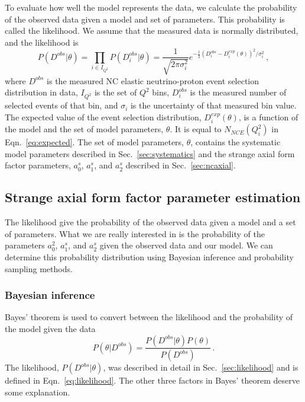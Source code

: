     To evaluate how well the model represents the data, we calculate the
    probability of the observed data given a model and set of parameters.  This
    probability is called the likelihood. We assume that the measured data is
    normally distributed, and the likelihood is
    \begin{equation}\label{eq:likelihood}
      P(D^{obs}|\theta) = \prod_{i\in I_{Q^2}} P(D^{obs}_i|\theta) = \frac{1}{\sqrt{2\pi \sigma_i^2}}
             e^{-\frac{1}{2}(D^{obs}_i - D^{exp}_i(\theta))^2/\sigma_i^2} \,,
    \end{equation}
    where $D^{obs}$ is the measured NC elastic neutrino-proton event selection
    distribution in data, $I_{Q^2}$ is the set of $Q^2$ bins, $D^{obs}_i$ is
    the measured number of selected events of that bin, and $\sigma_i$ is the
    uncertainty of that measured bin value. The expected value of the event
    selection distribution, $D^{exp}_i(\theta)$, is a function of the model and
    the set of model parameters, $\theta$. It is equal to $N_{NCE}(Q^2_i)$ in
    Eqn.~\ref{eq:expected}. The set of model parameters, $\theta$, contains the
    systematic model parameters described in Sec.~\ref{sec:systematics} and the
    strange axial form factor parameters, $a_0^s$, $a_1^s$, and $a_2^s$
    described in Sec.~\ref{sec:ncaxial}.
    

\subsection{Strange axial form factor parameter estimation}\label{sec:deltas}
  The likelihood give the probability of the observed data given a model and a
  set of parameters. What we are really interested in is the probability of the
  parameters $a_0^2$, $a_1^s$, and $a_2^s$ given the observed data and our
  model. We can determine this probability distribution using Bayesian
  inference and probability sampling methods.

  \subsubsection{Bayesian inference}
    Bayes' theorem is used to convert between the likelihood and the
    probability of the model given the data
    \begin{equation}
      P(\theta|D^{obs}) = \frac{P(D^{obs}|\theta)P(\theta)}{P(D^{obs})} \,.
    \end{equation}
    The likelihood, $P(D^{obs}|\theta)$, was described in detail in
    Sec.~\ref{sec:likelihood} and is defined in Eqn.~\ref{eq:likelihood}. The
    other three factors in Bayes' theorem deserve some explanation.
    
